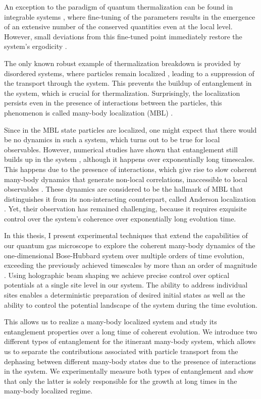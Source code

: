 An exception to the paradigm of quantum thermalization can be found in integrable systems \cite{Mazets2008}, where fine-tuning of the parameters results in the emergence of an extensive number of the conserved quantities even at the local level. However, small deviations from this fine-tuned point immediately restore the system’s ergodicity \cite{Tang2018}.

The only known robust example of thermalization breakdown is provided by disordered systems, where particles remain localized \cite{ Anderson1958}, leading to a suppression of the transport through the system. This prevents the buildup of entanglement in the system, which is crucial for thermalization. Surprisingly, the localization persists even in the presence of interactions between the particles, this phenomenon is called many-body localization (MBL) \cite{ Anderson1958, Gornyi2005, Basko2006, Oganesyan2007}.

Since in the MBL state particles are localized, one might expect that there would be no dynamics in such a system, which turns out to be true for local observables. However, numerical studies have shown that entanglement still builds up in the system \cite{Znidaric2008, Bardarson2012}, although it happens over exponentially long timescales. This happens due to the presence of interactions, which give rise to slow coherent many-body dynamics that generate non-local correlations, inaccessible to local observables \cite{Serbyn2013, Serbyn2013a, Huse2014}. These dynamics are considered to be the hallmark of MBL that distinguishes it from its non-interacting counterpart, called Anderson localization \cite{Anderson1958}. Yet, their observation has remained challenging, because it requires exquisite control over the system's coherence over exponentially long evolution time.

In this thesis, I present experimental techniques that extend the capabilities of our quantum gas microscope \cite{Bakr2009} to explore the coherent many-body dynamics of the one-dimensional Bose-Hubbard system over multiple orders of time evolution, exceeding the previously achieved timescales by more than an order of magnitude \cite{Smith2015}. Using holographic beam shaping we achieve precise control over optical potentials at a single site level in our system. The ability to address individual sites enables a deterministic preparation of desired initial states as well as the ability to control the potential landscape of the system during the time evolution.

This allows us to realize a many-body localized system and study its entanglement properties over a long time of coherent evolution. We introduce two different types of entanglement for the itinerant many-body system, which allows us to separate the contributions associated with particle transport from the dephasing between different many-body states due to the presence of interactions in the system. We experimentally measure both types of entanglement and show that only the latter is solely responsible for the growth at long times in the many-body localized regime.

